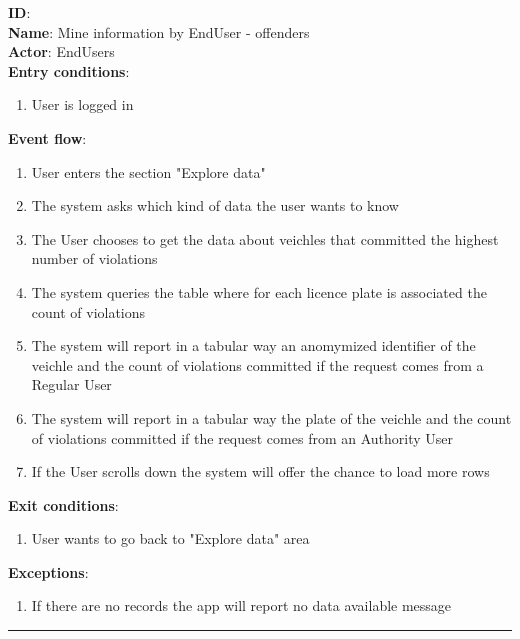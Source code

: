 \begin{enumerate}
\begin{itemize}
    \textbf{ID}:  \\
    \textbf{Name}: Mine information by EndUser - offenders \\
    \textbf{Actor}: EndUsers   \\
    \textbf{Entry conditions}:
    \begin{enumerate}
      \item{User is logged in}
    \end{enumerate}
    \textbf{Event flow}:
    \begin{enumerate}
      \item{User enters the section "Explore data"}
      \item{The system asks which kind of data the user wants to know}
      \item{The User chooses to get the data about veichles that committed the highest number of violations}
      \item{The system queries the table where for each licence plate is associated the count of violations }
      \item{The system will report in a tabular way an anomymized identifier of the veichle and the count of violations committed if the request comes from a Regular User}
      \item{The system will report in a tabular way the plate of the veichle and the count of violations committed if the request comes from an Authority User}
      \item{If the User scrolls down the system will offer the chance to load more rows}
    \end{enumerate}
    \textbf{Exit conditions}:
    \begin{enumerate}
      \item{User wants to go back to "Explore data" area}
    \end{enumerate}
    \textbf{Exceptions}:
    \begin{enumerate}
      \item{If there are no records the app will report no data available message}
    \end{enumerate}
    \rule{\linewidth}{0.4pt}


\end{itemize}
\end{enumerate}
